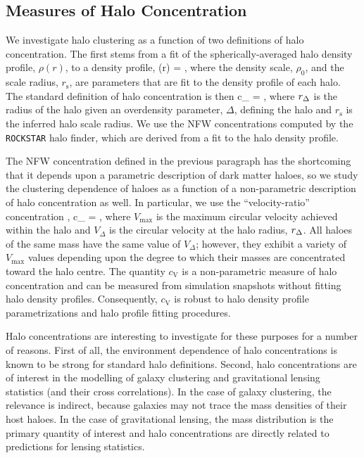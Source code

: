 \documentclass[usenatbib,fleqn]{mnras}
\begin{document}
\subsection{Measures of Halo Concentration}

We investigate halo clustering as a function of two definitions of halo concentration. The first stems from a fit of the spherically-averaged halo density profile, $\rho(r)$, to a \citet[hereafter NFW]{navarro_etal97} density profile, 
%
\beq
\rho(r) = ,
\eeq
%
where the density scale, $\rho_0$, and the scale radius, $r_{\mathrm{s}}$, are parameters that are fit to the density profile of each halo. The standard definition of halo concentration is then 
\beq
c_{} = ,
\eeq
where $r_{\Delta}$ is the radius of the halo given an overdensity parameter, $\Delta$, defining the halo and $r_{\mathrm{s}}$ is the inferred halo scale radius. We use the NFW concentrations computed by the {\tt ROCKSTAR} halo finder, which are derived from a fit to the halo density profile.  


The NFW concentration defined in the previous paragraph has the shortcoming that it 
depends upon a parametric description of dark matter haloes, so we study the clustering dependence of haloes as a function of a non-parametric description of halo concentration as well. In particular, we use the ``velocity-ratio'' concentration \citep{prada_etal12,klypin_etal16},
\beq
c_{} = , 
\eeq
where $V_{\mathrm{max}}$ is the maximum circular velocity achieved within the halo and $V_{\Delta}$ is the circular velocity at the halo radius, $r_{\Delta}$. All haloes of the same mass have the same value of $V_{\Delta}$; however, 
they exhibit a variety of $V_{\mathrm{max}}$ values depending upon the degree to which their masses are concentrated toward the halo centre. The quantity $c_{\mathrm{V}}$ is a non-parametric measure of halo concentration and can be measured from simulation snapshots without fitting halo density profiles. Consequently, $c_{\mathrm{V}}$ is robust to halo density profile parametrizations and halo profile fitting procedures. 

Halo concentrations are interesting to investigate for these purposes for a number of reasons. First of all, the environment dependence of halo concentrations is known to be strong for standard halo definitions. Second, halo concentrations are of interest in the modelling of galaxy clustering and gravitational lensing statistics (and their cross correlations). In the case of galaxy clustering, the relevance is indirect, because galaxies may not trace the mass densities of their host haloes. In the case of gravitational lensing, the mass distribution is the primary quantity of interest and halo concentrations are directly related to predictions for lensing statistics. 
\end{document}
